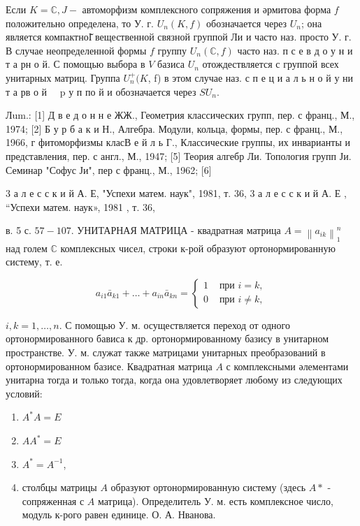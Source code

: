\documentclass[10pt]{article}
\begin{document}
Если $K=\mathbb{C}, J-$ автоморфизм комплексного сопряжения и әрмитова форма $f$ положительно определена, то У. г. $U_{n}(K, f)$ обозначается через $U_{n}$; она является компактноІ̆ вещественной связной группой Ли и часто наз. просто У. г. В случае неопределенной формы $f$ группу $U_{n}(\mathbb{C}, f)$ часто наз. п с е в д о у н и т а рн о й. С помощью выбора в $V$ базиса $U_{n}$ отождествляется с группой всех унитарных матриц. Группа $U_{n}^{+}(K$, f) в этом случае наз. с п е ц и а л ь н о й у ни т а рв о й $\quad \mathrm{p}$ у п по й и обозначается через $S U_{n}$.



Лum.: [1] Д в е д о н н е ЖЖ., Геометрия классических групп, пер. с франц., М., 1974; [2] Б у р б а к и Н., Алгебра. Модули, кольца, формы, пер. с франц., М., 1966, г фитоморфизмы класВ е й л ь Г., Классические группы, их инварианты и представления, пер. с англ., М., 1947; [5] Теория алгебр Ли. Топология групп Ји. Семинар "Софус Ји", пер с франц., М., 1962; [6]

3 а л е с с к и й А. Е, "Успехи матем. наук", 1981, т. 36, 3 а л е с с к и й А. Е , “Успехи матем. наук», 1981 , т. 36,

в. 5 с. $57-107$. УНИТАРНАЯ МАТРИЦА - квадратная матрица $A=\left\|a_{i k}\right\|_{1}^{n}$ над голем $\mathbb{C}$ комплексных чисел, строки к-рой образуют ортонормированную систему, т. е.



\[

a_{i 1} \bar{a}_{k 1}+\ldots+a_{i n} \bar{a}_{k n}= \begin{cases}1 & \text { при } i=k, \\ 0 & \text { при } i \neq k,\end{cases}

\]



$i, k=1, \ldots, n$. С помощью У. м. осуществляется переход от одного ортонормированного бависа к др. ортонормированному базису в унитарном пространстве. У. м. служат также матрицами унитарных преобразований в ортонормированном базисе. Квадратная матрица $A$ с комплексными әлементами унитарна тогда и только тогда, когда она удовлетворяет любому из следующих условий:



\begin{enumerate}

  \item $A^{*} A=E$



  \item $A A^{*}=E$



  \item $A^{*}=A^{-1}$,



  \item столбцы матрицы $A$ образуют ортонормированную систему (здесь $A *$ - сопряженная с $A$ матрица). Определитель У. м. есть комплексное число, модуль к-рого равен единице. О. А. Нванова.



\end{enumerate}
\end{document}
